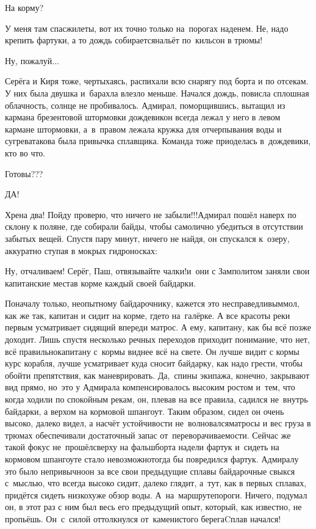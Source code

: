 \diagdash На корму?

\diagdash У меня там спасжилеты, вот их точно только на~порогах наденем. Не, надо крепить фартуки, а то дождь собирается\mdash нальёт по~кильсон в трюмы!

\diagdash Ну, пожалуй$\ldots$

Серёга и Киря тоже, чертыхаясь, распихали всю снарягу под борта и по отсекам. У них была двушка и~барахла влезло меньше. Начался дождь, повисла сплошная облачность, солнце не пробивалось. Адмирал, поморщившись, вытащил из кармана брезентовой штормовки дождевик\mdash он всегда лежал у него в левом кармане штормовки, а~в~правом лежала кружка для отчерпывания воды и сугрева\mdash такова была привычка сплавщика. Команда тоже приоделась в~дождевики, кто во что.

\diagdash Готовы???

\diagdash ДА!

\diagdash Хрена два! Пойду проверю, что ничего не забыли!!!\mdash Адмирал пошёл наверх по склону к поляне, где собирали байды, чтобы самолично убедиться в отсутствии забытых вещей. Спустя пару минут, ничего не найдя, он спускался к~озеру, аккуратно ступая в мокрых гидроносках:

\diagdash Ну, отчаливаем! Серёг, Паш, отвязывайте чалки!\mdash и~они с Замполитом заняли свои капитанские места\mdash в корме каждый своей байдарки. 

Поначалу только, неопытному байдарочнику, кажется это несправедливым\mdash мол, как же так, капитан и сидит на корме, где\sdash то на~галёрке. А все красоты реки первым усматривает сидящий впереди матрос. А ему, капитану, как бы всё позже доходит. Лишь спустя несколько речных переходов приходит понимание, что нет, всё правильно\mdash капитану с~кормы виднее всё на свете. Он лучше видит с кормы курс корабля, лучше усматривает куда сносит байдарку, как надо грести, чтобы обойти препятствия, как маневрировать. Да,~спины экипажа, конечно, закрывают вид прямо, но~это у Адмирала компенсировалось высоким ростом и~тем, что когда ходили по спокойным рекам, он, плевав на все правила, садился не~внутрь байдарки, а верхом на кормовой шпангоут. Таким образом, сидел он очень высоко, далеко видел, а насчёт устойчивости не~волновался\mdash матросы и вес груза в трюмах обеспечивали достаточный запас от~переворачиваемости. Сейчас же такой фокус не~прошёл\mdash сверху на фальшборта надели фартук и~сидеть на кормовом шпангоуте стало невозможно\mdash тогда бы повредился фартук. Адмиралу это было непривычно\mdash он за все свои предыдущие сплавы байдарочные свыкся с~мыслью, что всегда высоко сидит, далеко глядит, а~тут, как в первых сплавах, придётся сидеть низко\mdash хуже обзор воды. А~на~маршруте\mdash пороги. Ничего, подумал он, в этот раз с ним был весь его предыдущий опыт, который, как известно, не пропьёшь. Он~с~силой оттолкнулся от~каменистого берега\mdash Cплав начался!

